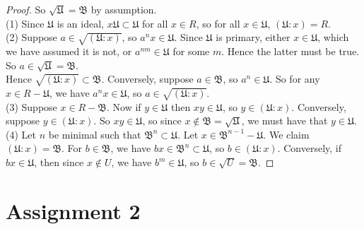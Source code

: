 \documentclass[reqno]{amsart}
\theoremstyle{definition}
\theoremstyle{remark}
\begin{document}
\begin{proof}
    So $\sqrt{\mathfrak{U}} = \mathfrak{B}$ by assumption.\\
    \linebreak
    (1) Since $\mathfrak{U}$ is an ideal,
    $x \mathfrak{U} \subset  \mathfrak{U}$ for
    all $x \in R$, so
     for all $x \in \mathfrak{U}$,
     $\left( \mathfrak{U} \colon x \right) = R$.\\
     (2) Suppose $a \in \sqrt{\left( \mathfrak{U}\colon
     x\right) } $, so
     $a^{n} x \in \mathfrak{U}$. Since $\mathfrak{U}$ is primary,
     either $x \in \mathfrak{U}$, which we have assumed it is
     not, or $a^{nm} \in \mathfrak{U}$ for some $m$. Hence
     the latter must be true. So
     $a \in \sqrt{\mathfrak{U}} = \mathfrak{B}$.\\
     Hence
     $ \sqrt{\left( \mathfrak{U} : x \right) } \subset
     \mathfrak{B}$.
     Conversely, suppose
     $a \in \mathfrak{B}$, so
     $a^{n} \in \mathfrak{U}$. So for
     any $x \in R - \mathfrak{U}$, we have
     $a^{n} x \in \mathfrak{U}$, so
     $a \in \sqrt{\left( \mathfrak{U} : x \right) } $.\\
     (3) Suppose
     $x \in R - \mathfrak{B}$.
     Now if $y \in \mathfrak{U}$ then
     $xy \in \mathfrak{U}$, so
     $y \in \left( \mathfrak{U} : x \right) $.
     Conversely, suppose
     $y \in \left( \mathfrak{U} : x \right) $.
     So $xy \in \mathfrak{U}$, so
     since  $x \not\in \mathfrak{B} =
     \sqrt{\mathfrak{U}} $, we must have that
     $y \in \mathfrak{U}$.\\
     (4) Let $n$ be minimal such that
     $\mathfrak{B}^{n} \subset \mathfrak{U}$.
     Let
     $x \in \mathfrak{B}^{n-1} - \mathfrak{U}$.
     We claim
     $\left( \mathfrak{U} : x \right) = \mathfrak{B}$.
     For $b \in \mathfrak{B}$, we have
     $bx \in \mathfrak{B}^{n} \subset
     \mathfrak{U}$, so
     $b \in \left( \mathfrak{U} : x \right) $.
     Conversely, if
     $bx \in \mathfrak{U}$, then
     since  $x \not\in U$, we have
     $b^{m} \in \mathfrak{U}$, so
     $b \in \sqrt{U} = \mathfrak{B}$.
\end{proof}


\section{Assignment 2}
\end{document}
